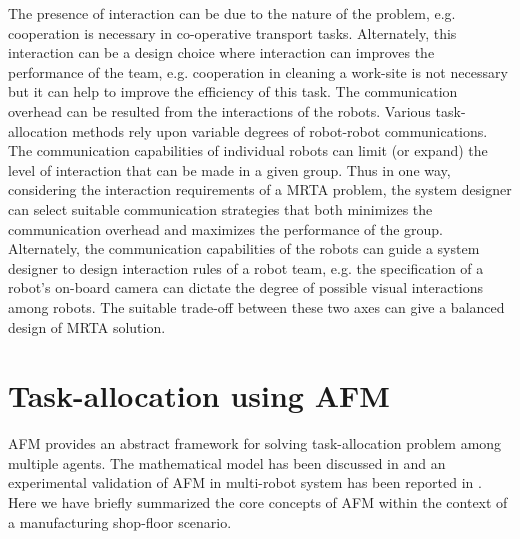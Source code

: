 \documentclass[journal]{IEEEtran}
\begin{document}
The presence of interaction can be due to the nature of the problem, e.g. cooperation is necessary in co-operative transport tasks. Alternately, this interaction can be a design choice where interaction can improves the performance of the team, e.g. cooperation in cleaning a work-site is not necessary but it can help to improve the efficiency of this task. %
The communication overhead can be resulted from the interactions of the robots. Various task-allocation methods rely upon variable degrees of robot-robot communications.  The communication capabilities of individual robots can limit (or expand) the level of interaction that can be made in a given group. Thus in one way, considering the interaction requirements of a MRTA problem, the system designer can select suitable communication strategies that both minimizes the communication overhead and maximizes the performance of the group. Alternately, the communication capabilities of the robots can guide a system designer to design interaction rules of a robot team, e.g. the specification of a robot's on-board camera can dictate the degree of possible visual interactions among robots. The suitable trade-off between these two axes can give a balanced design of MRTA solution.
\section{Task-allocation using AFM}
\label{sec:afm-mrta}
AFM provides an abstract framework for solving task-allocation problem among multiple agents. The mathematical model has been discussed in \cite{Arcaute+2008} and an experimental validation of AFM in multi-robot system has been reported in \cite{Sarker+2010ants}. Here we have briefly summarized the core concepts of AFM within the context of a  manufacturing shop-floor scenario.
\end{document}
